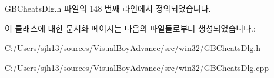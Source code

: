 G\+B\+Cheats\+Dlg.\+h 파일의 148 번째 라인에서 정의되었습니다.



이 클래스에 대한 문서화 페이지는 다음의 파일들로부터 생성되었습니다.\+:\begin{DoxyCompactItemize}
\item 
C\+:/\+Users/sjh13/sources/\+Visual\+Boy\+Advance/src/win32/\mbox{\hyperlink{_g_b_cheats_dlg_8h}{G\+B\+Cheats\+Dlg.\+h}}\item 
C\+:/\+Users/sjh13/sources/\+Visual\+Boy\+Advance/src/win32/\mbox{\hyperlink{_g_b_cheats_dlg_8cpp}{G\+B\+Cheats\+Dlg.\+cpp}}\end{DoxyCompactItemize}
